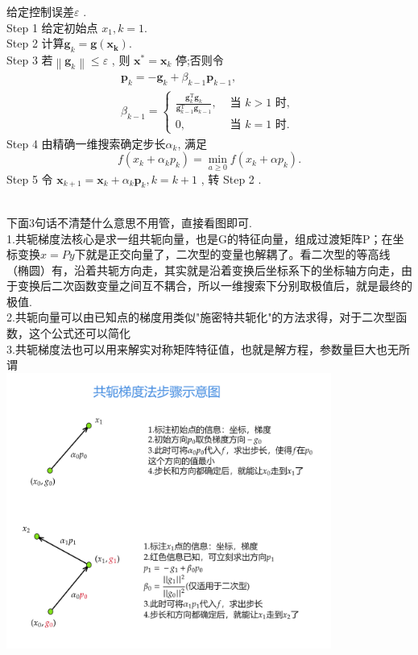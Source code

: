 \documentclass[cn]{elegantbook}
\begin{document}
\begin{algorithm}
给定控制误差$  \varepsilon$ .\\
Step 1 给定初始点 $ x_{1}, k=1 $.\\
Step 2 计算$  \boldsymbol{g}_{k}=\boldsymbol{g}\left(\boldsymbol{x}_{\mathbf{k}}\right) $.\\
Step 3 若$  \left\|\boldsymbol{g}_{k}\right\| \leqslant \varepsilon$ , 则  $\boldsymbol{x}^{*}=\boldsymbol{x}_{k}$  停;否则令
$$
\begin{array}{l}
\boldsymbol{p}_{k}=-\boldsymbol{g}_{k}+\beta_{k-1} \boldsymbol{p}_{k-1}, \\
\beta_{k-1}=\left\{\begin{array}{cl}
\frac{\boldsymbol{g}_{k}^{\mathrm{T}} \boldsymbol{g}_{k}}{\boldsymbol{g}_{k-1}^{\mathrm{T}} \boldsymbol{g}_{k-1}}, & \text { 当 } k>1 \text { 时, } \\
0, & \text { 当 } k=1 \text { 时. }
\end{array}\right.
\end{array}
$$
Step 4 由精确一维搜索确定步长$  \alpha_{k} $, 满足
$$
f\left(x_{k}+\alpha_{k} p_{k}\right)=\min _{a \geq 0} f\left(x_{k}+\alpha p_{k}\right) .
$$
Step 5 令  $\boldsymbol{x}_{k+1}=\boldsymbol{x}_{k}+\alpha_{k} \boldsymbol{p}_{k}, k=k+1$ , 转 Step 2 .
\end{algorithm}
\begin{note}
\\下面3句话不清楚什么意思不用管，直接看图即可.\\
  1.共轭梯度法核心是求一组共轭向量，也是G的特征向量，组成过渡矩阵P；在坐标变换$x=Py$下就是正交向量了，二次型的变量也解耦了。看二次型的等高线（椭圆）有，沿着共轭方向走，其实就是沿着变换后坐标系下的坐标轴方向走，由于变换后二次函数变量之间互不耦合，所以一维搜索下分别取极值后，就是最终的极值. \\
  2.共轭向量可以由已知点的梯度用类似"施密特共轭化"的方法求得，对于二次型函数，这个公式还可以简化 \\
  3.共轭梯度法也可以用来解实对称矩阵特征值，也就是解方程，参数量巨大也无所谓\\
  \includegraphics[width=0.8\textwidth]{fig2}
\end{note}
\end{document}

